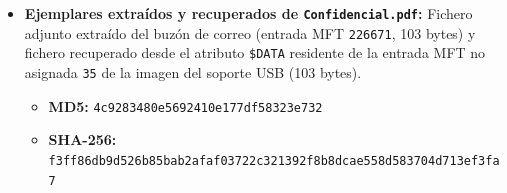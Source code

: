 \begin{itemize}[leftmargin=1.5em, itemsep=0.55em]
	\item \textbf{Ejemplares extraídos y recuperados de \texttt{Confidencial.pdf}:} Fichero adjunto extraído del buzón de correo (entrada MFT \texttt{226671}, 103 bytes) y fichero recuperado desde el atributo \texttt{\$DATA} residente de la entrada MFT no asignada \texttt{35} de la imagen del soporte USB (103 bytes).
	\begin{itemize}[leftmargin=1.2em]
		\item \textbf{MD5:} \texttt{4c9283480e5692410e177df58323e732}
		\item \textbf{SHA-256:} \texttt{f3ff86db9d526b85bab2afaf03722c321392f8b8dcae558d583704d713ef3fa7}
	\end{itemize}
\end{itemize}